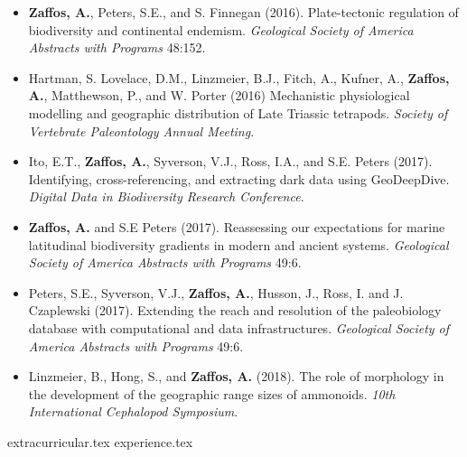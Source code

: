 \documentclass[12pt, a4paper]{awesome-cv}
\newcommand*{\sectiondir}{resume/}
\begin{document}
\begin{itemize}[leftmargin=*]
\item{\textbf{Zaffos, A.}, Peters, S.E., and S. Finnegan (2016). Plate-tectonic regulation of biodiversity and continental endemism. \textit{Geological Society of America Abstracts with Programs} 48:152.}
\item{Hartman, S. Lovelace, D.M., Linzmeier, B.J., Fitch, A., Kufner, A., \textbf{Zaffos, A.}, Matthewson, P., and W. Porter (2016) Mechanistic physiological modelling and geographic distribution of Late Triassic tetrapods. \textit{Society of Vertebrate Paleontology Annual Meeting}.}
\item{Ito, E.T., \textbf{Zaffos, A.}, Syverson, V.J., Ross, I.A., and S.E. Peters (2017). Identifying, cross-referencing, and extracting dark data using GeoDeepDive. \textit{Digital Data in Biodiversity Research Conference}.}
\item{\textbf{Zaffos, A.} and S.E Peters (2017). Reassessing our expectations for marine latitudinal biodiversity gradients in modern and ancient systems. \textit{Geological Society of America Abstracts with Programs} 49:6.}
\item{Peters, S.E., Syverson, V.J., \textbf{Zaffos, A.}, Husson, J., Ross, I. and J. Czaplewski (2017). Extending the reach and resolution of the paleobiology database with computational and data infrastructures. \textit{Geological Society of America Abstracts with Programs} 49:6.}
\item{Linzmeier, B., Hong, S., and \textbf{Zaffos, A.} (2018). The role of morphology in the development of the geographic range sizes of ammonoids. \textit{10th International Cephalopod Symposium}.}
\end{itemize}

{extracurricular.tex}
\vspace{-20pt}
{experience.tex}
\vspace{-20pt}
\end{document}
